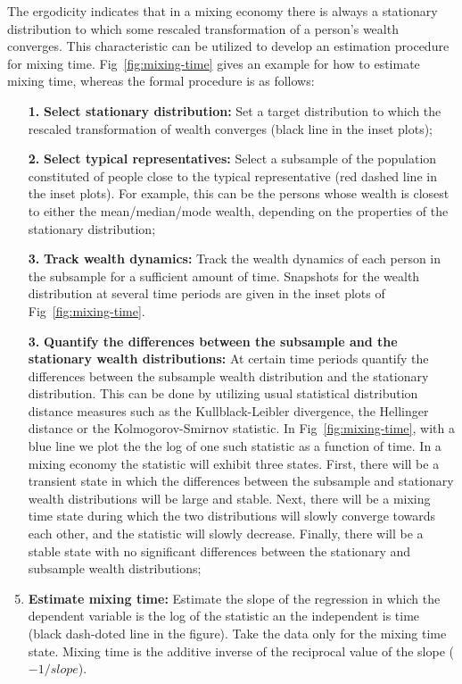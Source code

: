 \documentclass[11pt]{article}
\numberwithin{equation}{section}
\begin{document}
The ergodicity indicates that in a mixing economy there is always a stationary distribution to which some rescaled transformation of a person's wealth converges. This characteristic can be utilized to develop an estimation procedure for mixing time. Fig~\ref{fig:mixing-time} gives an example for how to estimate mixing time, whereas the formal procedure is as follows:
\begin{enumerate}
    \item[\textbf{1.}] \textbf{Select stationary distribution:} Set a target distribution to which the rescaled transformation of wealth converges (black line in the inset plots);
    \item[\textbf{2.}] \textbf{Select typical representatives:} Select a subsample of the population constituted of people close to the typical representative (red dashed line in the inset plots). For example, this can be the persons whose wealth is closest to either the mean/median/mode wealth, depending on the properties of the stationary distribution;
    \item[\textbf{3.}] \textbf{Track wealth dynamics:} Track the wealth dynamics of each person in the subsample for a sufficient amount of time. Snapshots for the wealth distribution at several time periods are given in the inset plots of Fig~\ref{fig:mixing-time}.
    \item[\textbf{3.}] \textbf{Quantify the differences between the subsample and the stationary wealth distributions:} At certain time periods quantify the differences between the subsample wealth distribution and the stationary distribution. This can be done by utilizing usual statistical distribution distance measures such as the Kullblack-Leibler divergence, the Hellinger distance or the Kolmogorov-Smirnov statistic. In Fig~\ref{fig:mixing-time}, with a blue line we plot the the log of one such statistic as a function of time. In a mixing economy the statistic will exhibit three states. First, there will be a transient state in which the differences between the subsample and stationary wealth distributions will be large and stable. Next, there will be a mixing time state during which the two distributions will slowly converge towards each other, and the statistic will slowly decrease. Finally, there will be a stable state with no significant differences between the stationary and subsample wealth distributions; 
    \item \textbf{Estimate mixing time:} Estimate the slope of the regression in which the dependent variable is the log of the statistic an the independent is time (black dash-doted line in the figure). Take the data only for the mixing time state. Mixing time is the additive inverse of the reciprocal value of the slope ($-1 / slope$).
\end{enumerate}
\end{document}
